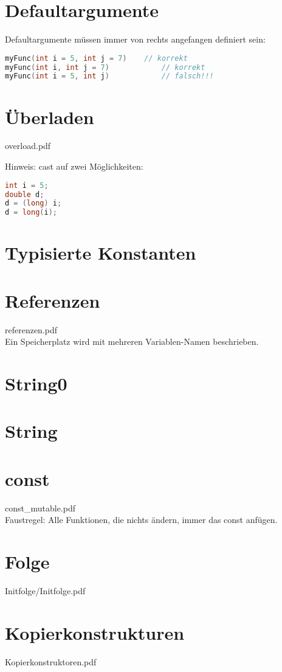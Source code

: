 \section{Defaultargumente}
Defaultargumente müssen immer von rechts angefangen definiert sein:
\begin{lstlisting}[language=C++]
myFunc(int i = 5, int j = 7)	// korrekt
myFunc(int i, int j = 7)			// korrekt
myFunc(int i = 5, int j)			// falsch!!!
\end{lstlisting}

\section{Überladen}
overload.pdf

Hinweis: cast auf zwei Möglichkeiten:
\begin{lstlisting}[language=C++]
int i = 5;
double d;
d = (long) i;
d = long(i);
\end{lstlisting}

\section{Typisierte Konstanten}

\section{Referenzen}
referenzen.pdf\\
Ein Speicherplatz wird mit mehreren Variablen-Namen beschrieben.

\section{String0}
\section{String}
\section{const}
const\_mutable.pdf\\
Faustregel: Alle Funktionen, die nichts ändern, immer das const anfügen.
\section{Folge}
Initfolge/Initfolge.pdf
\section{Kopierkonstrukturen}
Kopierkonstruktoren.pdf

